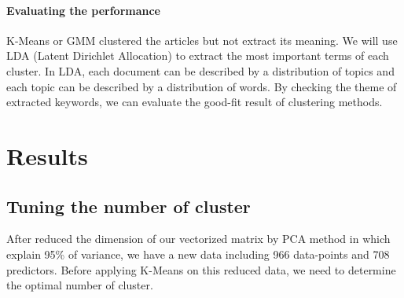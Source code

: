 \documentclass[12pt]{article}
\begin{document}
\paragraph{Evaluating the performance} K-Means or GMM clustered the articles but not extract its meaning. We will use LDA (Latent Dirichlet Allocation) to extract the most important terms of each cluster. In LDA, each document can be described by a distribution of topics and each topic can be described by a distribution of words. By checking the theme of extracted keywords, we can evaluate the good-fit result of clustering methods.

\section{Results}
\subsection{Tuning the number of cluster}
After reduced the dimension of our vectorized matrix by PCA method in which explain 95\% of variance, we have a new data including 966 data-points and 708 predictors. Before applying K-Means on this reduced data, we need to determine the optimal number of cluster. 
\end{document}
